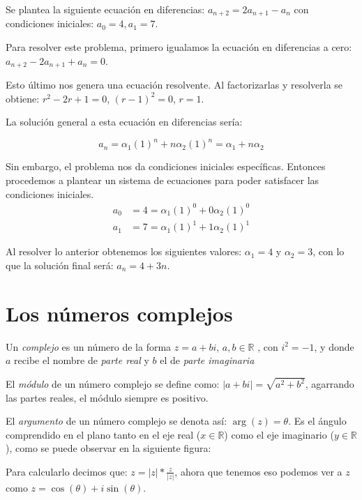\documentclass{report}
\begin{document}
Se plantea la siguiente ecuación en diferencias:
$a_{n+2}=2a_{n+1}-a_{n}$ con condiciones iniciales: $a_{0}=4, a_{1}=7$.

Para resolver este problema, primero igualamos la ecuación en diferencias a
cero: $a_{n+2}-2a_{n+1}+a_{n}=0$.

Esto último nos genera una ecuación resolvente. Al factorizarlas y
resolverla se obtiene: $r^2-2r+1=0$, $(r-1)^2=0$, ${r=1}$.

La solución general a esta ecuación en diferencias sería:



$$a_{n}=\alpha_{1}(1)^n+n\alpha_{2}(1)^n=\alpha_{1}+n\alpha_{2}$$

Sin embargo, el problema nos da condiciones iniciales
específicas. Entonces procedemos a plantear un sistema de ecuaciones
para poder satisfacer las condiciones iniciales.
\begin{align*}
  a_{0}&=4=\alpha_{1}(1)^0+0\alpha_{2}(1)^0\\
  a_{1}&=7=\alpha_{1}(1)^1+1\alpha_{2}(1)^1
\end{align*}

Al resolver lo anterior obtenemos los siguientes valores:
$\alpha_{1}=4$ y $\alpha_{2}=3$, con lo que la solución final será:
$a_{n}=4+3n$.


\section{Los números  complejos}

Un \textit{complejo} es un número de la forma $z=a+bi$, $a,b\in\mathbb{R}$ ,
con $i^2=-1$, y donde $a$ recibe el nombre de \textit{parte real} y $b$ el de
\textit{parte imaginaria}

El \textit{módulo} de un número complejo se define como:
$|a+bi|=\sqrt{a^2+b^2}$, agarrando las partes reales, el módulo
siempre es positivo.

El \textit{argumento} de un número complejo se denota así: $\arg(z)=\theta$. Es
el ángulo comprendido en el plano tanto en el eje real
($x\in\mathbb{R}$) como el eje imaginario ($y\in\mathbb{R}$), como se puede observar en la siguiente figura:
\begin{center}
\end{center}
Para calcularlo decimos que:
$z=|z|*\frac{z}{|z|}$, ahora que tenemos eso podemos ver a $z$ como
$z=\cos(\theta)+i\sin(\theta)$.
\end{document}
